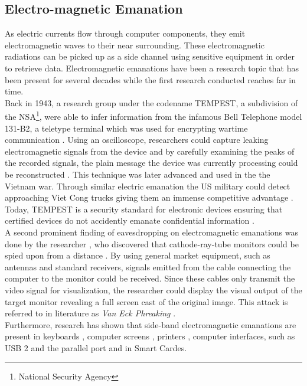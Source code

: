 \subsection{Electro-magnetic Emanation}

As electric currents flow through computer components, they emit electromagnetic waves to their near surrounding. These electromagnetic radiations can be picked up as a side channel using sensitive equipment in order to retrieve data. Electromagnetic emanations have been a research topic that has been present for several decades while the first research conducted reaches far in time. \\

Back in 1943, a research group under the codename TEMPEST, a subdivision of the NSA\footnote{National Security Agency}, were able to infer information from the infamous Bell Telephone model 131-B2, a teletype terminal which was used for encrypting wartime communication \cite{tempest}. Using an oscilloscope, researchers could capture leaking electromagnetic signals from the device and by carefully examining the peaks of the recorded signals, the plain message the device was currently processing could be reconstructed \cite{tempest}. This technique was later advanced and used in the the Vietnam war. Through similar electric emanation the US military could detect approaching Viet Cong trucks giving them an immense competitive advantage \cite{nalty2005war}. Today, TEMPEST is a security standard for electronic devices ensuring that certified devices do not accidently emanate confidential information \cite{niaTempest}.\\

A second prominent finding of eavesdropping on electromagnetic emanations was done by the researcher \citeauthor{vanEck:1985:ERV:7307.7308}, who discovered that cathode-ray-tube monitors could be spied upon from a distance \cite{vanEck:1985:ERV:7307.7308}. By using general market equipment, such as antennas \citeauthor{vanEck:1985:ERV:7307.7308} and standard receivers, signals emitted from the cable connecting the computer to the monitor could be received. Since these cables only transmit the video signal for visualization, the researcher could display the visual output of the target monitor revealing a full screen cast of the original image. This attack is referred to in literature as \textit{Van Eck Phreaking} \cite{S&S,koch2012role}.\\

Furthermore, research has shown that side-band electromagnetic emanations are present in keyboards \cite{Vuagnoux:2009:CEE:1855768.1855769}, computer screens \cite{vanEck:1985:ERV:7307.7308,kuhn2004electromagnetic}, printers \cite{przesmycki2014measurement}, computer interfaces, such as USB 2 \cite{nowosielski2014compromising} and the parallel port \cite{serialcablearticle} and in Smart Cardes\cite{Quisquater:2001:EAM:646803.705980}.\\

